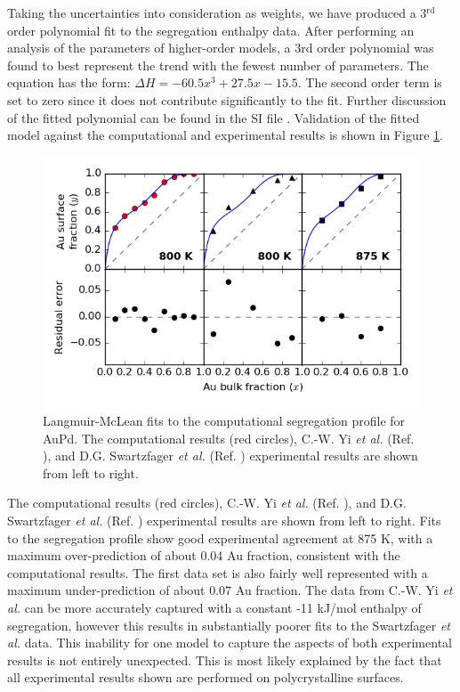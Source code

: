 \documentclass[12pt]{cmuthesis}
\begin{document}
Taking the uncertainties into consideration as weights, we have produced a 3\(^{\text{rd}}\) order polynomial fit to the segregation enthalpy data. After performing an analysis of the parameters of higher-order models, a 3rd order polynomial was found to best represent the trend with the fewest number of parameters. The equation has the form: \(\Delta H = -60.5x^3 + 27.5x - 15.5\). The second order term is set to zero since it does not contribute significantly to the fit. Further discussion of the fitted polynomial can be found in the SI file \cite{boes-2017-model-segreg}. Validation of the fitted model against the computational and experimental results is shown in Figure \ref{fig-fit-prediction}.

\begin{figure}[h]
\centering
\includegraphics[width=5in]{./images/fit-prediction.png}
\caption{\label{fig-fit-prediction}
Langmuir-McLean fits to the computational segregation profile for AuPd. The computational results (red circles), C.-W. Yi \emph{et al.} (Ref. ), and D.G. Swartzfager \emph{et al.} (Ref. ) experimental results are shown from left to right.}
\end{figure}

The computational results (red circles), C.-W. Yi \emph{et al.} (Ref. ), and D.G. Swartzfager \emph{et al.} (Ref. ) experimental results are shown from left to right. Fits to the segregation profile show good experimental agreement at 875 K, with a maximum over-prediction of about 0.04 Au fraction, consistent with the computational results. The first data set is also fairly well represented with a maximum under-prediction of about 0.07 Au fraction. The data from C.-W. Yi \emph{et al.} can be more accurately captured with a constant -11 kJ/mol enthalpy of segregation, however this results in substantially poorer fits to the Swartzfager \emph{et al.} data. This inability for one model to capture the aspects of both experimental results is not entirely unexpected. This is most likely explained by the fact that all experimental results shown are performed on polycrystalline surfaces.
\end{document}

